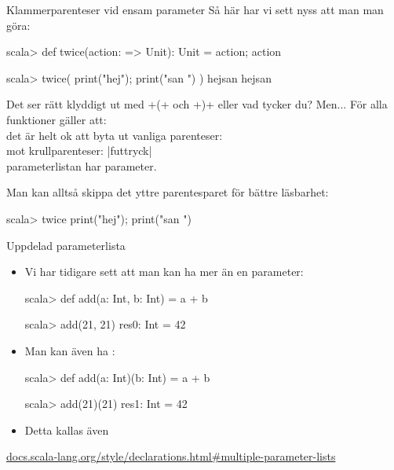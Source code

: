\begin{Slide}{Klammerparenteser vid ensam parameter}
Så här har vi sett nyss att man man göra:
\begin{REPL}
scala> def twice(action: => Unit): Unit = { action; action }

scala> twice( { print("hej"); print("san ") } )
hejsan hejsan
\end{REPL}

Det ser rätt klyddigt ut med \code+{(+  och \code+)}+ eller vad tycker du? \pause Men...
För alla funktioner  gäller att: \\ det är helt ok att byta ut vanliga parenteser: \hfill{} \\ mot krullparenteser: \hfill\code|f{uttryck}| \\  parameterlistan har  parameter.

\vspace{0.5em}Man kan alltså skippa det yttre parentesparet för bättre läsbarhet:
\begin{REPLnonum}
scala> twice { print("hej"); print("san ") }
\end{REPLnonum}


\end{Slide}

\begin{Slide}{Uppdelad parameterlista}
\begin{itemize}
\item Vi har tidigare sett att man kan ha mer än en parameter:
\begin{REPLnonum}
scala> def add(a: Int, b: Int) = a + b

scala> add(21, 21)
res0: Int = 42
\end{REPLnonum}

\item Man kan även ha  :
\begin{REPLnonum}

scala> def add(a: Int)(b: Int) = a + b

scala> add(21)(21)
res1: Int = 42
\end{REPLnonum}
\item Detta kallas även  
\end{itemize}
\href{http://docs.scala-lang.org/style/declarations.html#multiple-parameter-lists}{\SlideFontTiny docs.scala-lang.org/style/declarations.html\#multiple-parameter-lists}
\end{Slide}


